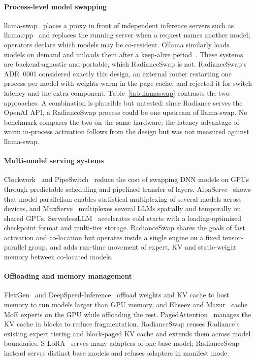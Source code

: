 \documentclass[10pt,conference,a4paper]{IEEEtran}
\begin{document}
\paragraph{Process-level model swapping} llama-swap~\cite{llamaswap} places a proxy in front of
independent inference servers such as llama.cpp~\cite{llamacpp} and replaces the running server
when a request names another model; operators declare which models may be co-resident. Ollama
similarly loads models on demand and unloads them after a keep-alive period~\cite{ollama}. These
systems are backend-agnostic and portable, which RadianceSwap is not. RadianceSwap's ADR~0001
considered exactly this design, an external router restarting one process per model with weights
warm in the page cache, and rejected it for switch latency and the extra component.
Table~\ref{tab:llamaswap} contrasts the two approaches. A combination is plausible but untested:
since Radiance serves the OpenAI API, a RadianceSwap process could be one upstream of llama-swap.
No benchmark compares the two on the same hardware; the latency advantage of warm in-process
activation follows from the design but was not measured against llama-swap.

\paragraph{Multi-model serving systems} Clockwork~\cite{clockwork} and PipeSwitch~\cite{pipeswitch}
reduce the cost of swapping DNN models on GPUs through predictable scheduling and pipelined
transfer of layers. AlpaServe~\cite{alpaserve} shows that model parallelism enables statistical
multiplexing of several models across devices, and MuxServe~\cite{muxserve} multiplexes several
LLMs spatially and temporally on shared GPUs. ServerlessLLM~\cite{serverlessllm} accelerates
cold starts with a loading-optimized checkpoint format and multi-tier storage. RadianceSwap shares
the goals of fast activation and co-location but operates inside a single engine on a fixed
tensor-parallel group, and adds run-time movement of expert, KV and static-weight memory between
co-located models.

\paragraph{Offloading and memory management} FlexGen~\cite{flexgen} and
DeepSpeed-Inference~\cite{dsinference} offload weights and KV cache to host memory to run models
larger than GPU memory, and Eliseev and Mazur~\cite{eliseev2023} cache MoE experts on the GPU while
offloading the rest. PagedAttention~\cite{vllm} manages the KV cache in blocks to reduce
fragmentation. RadianceSwap reuses Radiance's existing expert tiering and block-paged KV cache and
extends them across model boundaries. S-LoRA~\cite{slora} serves many adapters of one base model;
RadianceSwap instead serves distinct base models and refuses adapters in manifest mode.
\end{document}
